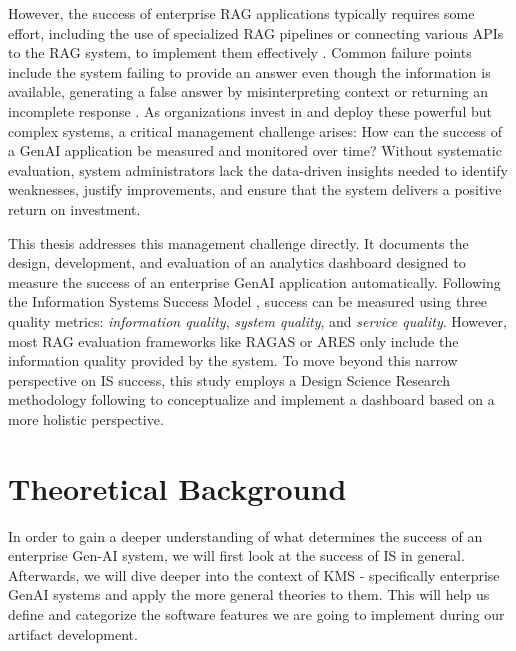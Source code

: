 \documentclass[
	english,
	ruledheaders=section,%
	class=report,%
	thesis={type=bachelor},%
	accentcolor=1b,%
	custommargins=true,%
	marginpar=false,%
	parskip=half-,%
	fontsize=11pt,%
	DIV=14,
]{tudapub}
\begin{document}
However, the success of enterprise RAG applications typically requires some effort, including the use of specialized RAG pipelines or connecting various APIs to the RAG system, to implement them effectively \parencite[p.~6--7]{Bruckhaus2024RAG}. Common failure points include the system failing to provide an answer even though the information is available, generating a false answer by misinterpreting context or returning an incomplete response \parencite[p.~4]{Barnett_Kurniawan_Thudumu_Brannelly_Abdelrazek_2024}. As organizations invest in and deploy these powerful but complex systems, a critical management challenge arises: How can the success of a GenAI application be measured and monitored over time? Without systematic evaluation, system administrators lack the data-driven insights needed to identify weaknesses, justify improvements, and ensure that the system delivers a positive return on investment.

This thesis addresses this management challenge directly. It documents the design, development, and evaluation of an analytics dashboard designed to measure the success of an enterprise GenAI application automatically. Following the Information Systems Success Model \parencite{DeloneMcLean2003ISSuccessTenYearUpdate}, success can be measured using three quality metrics: \textit{information quality}, \textit{system quality}, and \textit{service quality}. However, most RAG evaluation frameworks like RAGAS \parencite{Es_James_Espinosa_Anke_Schockaert_2024} or ARES \parencite{Saad_Falcon_Khattab_Potts_Zaharia_2024} only include the information quality provided by the system. To move beyond this narrow perspective on IS success, this study employs a Design Science Research methodology following \cite{Peffers01122007} to conceptualize and implement a dashboard based on a more holistic perspective.
\chapter{Theoretical Background}
In order to gain a deeper understanding of what determines the success of an enterprise Gen-AI system, we will first look at the success of IS in general. Afterwards, we will dive deeper into the context of KMS - specifically enterprise GenAI systems and apply the more general theories to them. This will help us define and categorize the software features we are going to implement during our artifact development.
\end{document}
